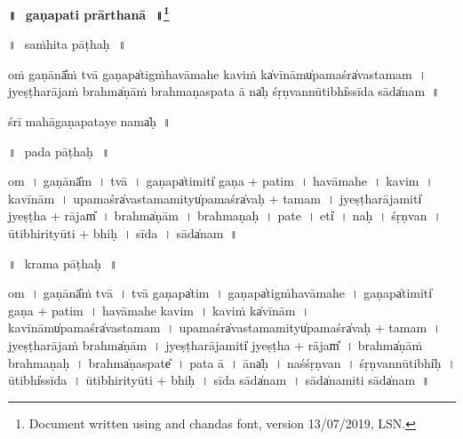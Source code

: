 \documentclass[parskip, DIV=14]{scrartcl}
\renewcommand{\thefootnote}{\fnsymbol{footnote}} %
\begin{document}

\vspace{-1.5cm}

\begin{center}
\textbf{{\Huge॥\,~gaṇapati prārthanā\,~॥\LARGE\let\thefootnote\relax\footnote{\color{lightgray} Document written using \XeLaTeX{} and chandas font,  version 13/07/2019, LSN.}}}
\end{center}
\Large

{\centering	


॥\,~saṁhita pāṭhaḥ\,~॥\\
\vspace{0.5cm}

oṁ ga॒ṇānā̎ṁ tvā ga॒ṇapa̍tigṁhavāmahe
ka॒viṁ ka̍vī॒nāmu̍pa॒maśra̍vastamam~।
jye॒ṣṭha॒rāja॒ṁ brahma̍ṇāṁ brahmaṇaspata॒
ā na̍ḥ śṛ॒ṇvannū॒tibhi̍ssīda॒ sāda̍nam~॥ 

śrī mahāgaṇapataye॒ nama̍ḥ~॥
\vspace{1.0cm}

॥\,~pada pāṭhaḥ\,~॥\\
\vspace{0.5cm}

om~।
ga॒ṇānā̎m~।
tvā॒~।
ga॒ṇapa̍ti॒miti̍ ga॒ṇa + pa॒ti॒m~।
ha॒vā॒ma॒he॒~।
ka॒vim~।
ka॒vī॒nām~।
u॒pa॒maśra̍vastama॒mityu̍pa॒maśra̍vaḥ + ta॒ma॒m~।
jye॒ṣṭha॒rāja॒miti̍ jyeṣṭha + rājam̎~।
brahma̍ṇām~।
bra॒hma॒ṇa॒ḥ~।
pa॒te॒~।
eti̍~।
na॒ḥ~।
śṛ॒ṇvan~।
ū॒tibhi॒rityū॒ti + bhi॒ḥ~।
sī॒da॒~।
sāda̍nam~॥
\vspace{1cm}

॥\,~krama pāṭhaḥ\,~॥\\
\vspace{0.5cm}

om~। 
ga॒ṇānā̎ṁ tvā~।
tvā॒ ga॒ṇapa̍tim~।
ga॒ṇapa̍tigṁhavāmahe~।
ga॒ṇapa̍ti॒miti̍ ga॒ṇa + pa॒ti॒m~।
ha॒vā॒ma॒he॒ ka॒vim~।
ka॒viṁ ka̍vī॒nām~।
ka॒vī॒nāmu̍pa॒maśra̍vastamam~। 
u॒pa॒maśra̍vastama॒mityu̍pa॒maśra̍vaḥ + ta॒ma॒m~। 
jye॒ṣṭha॒rāja॒ṁ brahma̍ṇām~।
jye॒ṣṭha॒rāja॒miti̍ jyeṣṭha + rājam̎~।
brahma̍ṇāṁ brahmaṇaḥ~।
brahma̍ṇa॒spate̎~।
pa॒ta॒ ā~।
āna̍ḥ~।
na॒śśṛ॒ṇvan~।
śṛ॒ṇvannū॒tibhi̍ḥ~।
ū॒tibhi̍ssīda~।
ū॒tibhi॒rityū॒ti + bhi॒ḥ~। 
sī॒da॒ sāda̍nam~। 
sāda̍na॒miti॒ sāda̍nam~॥ 

}
\end{document}
